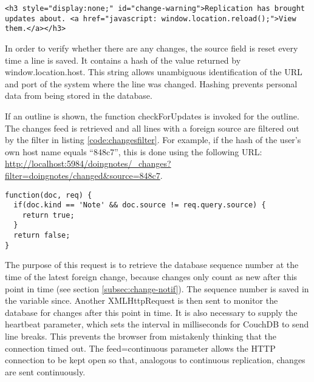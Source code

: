\lstset{language=html}
\medskip 
\begin{lstlisting}[caption=Change notification]
<h3 style="display:none;" id="change-warning">Replication has brought updates about. <a href="javascript: window.location.reload();">View them.</a></h3>
\end{lstlisting}

In order to verify whether there are any changes, the {\selectfont source} field is reset every time a line is saved. It contains a hash of the value returned by {\selectfont window.location.host}. This string allows unambiguous identification of the URL and port of the system where the line was changed. Hashing prevents personal data from being stored in the database.

If an outline is shown, the function {\selectfont checkForUpdates} is invoked for the outline. The changes feed is retrieved and all lines with a foreign {\selectfont source} are filtered out by the filter in listing \ref{code:changesfilter}. For example, if the hash of the user's own host name equals \enquote{848c7}, this is done using the following URL: \url{http://localhost:5984/doingnotes/\_changes?filter=doingnotes/changed&source=848c7}.

\lstset{language=javascript}
\medskip 
\begin{lstlisting}[label=code:changesfilter, caption={\fontfamily{pcr}\selectfont changed} filter for the changes feed]
function(doc, req) {
  if(doc.kind == 'Note' && doc.source != req.query.source) {
    return true;
  }
  return false;
}
\end{lstlisting}

The purpose of this request is to retrieve the database sequence number at the time of the latest foreign change, because changes only count as new after this point in time (see section \ref{subsec:change-notif}). The sequence number is saved in the variable {\selectfont since}. Another XMLHttpRequest is then sent to monitor the database for changes after this point in time. It is also necessary to supply the {\selectfont heartbeat} parameter, which sets the interval in milliseconds for CouchDB to send line breaks. This prevents the browser from mistakenly thinking that the connection timed out. The {\selectfont feed=continuous} parameter allows the HTTP connection to be kept open so that, analogous to continuous replication, changes are sent continuously.

